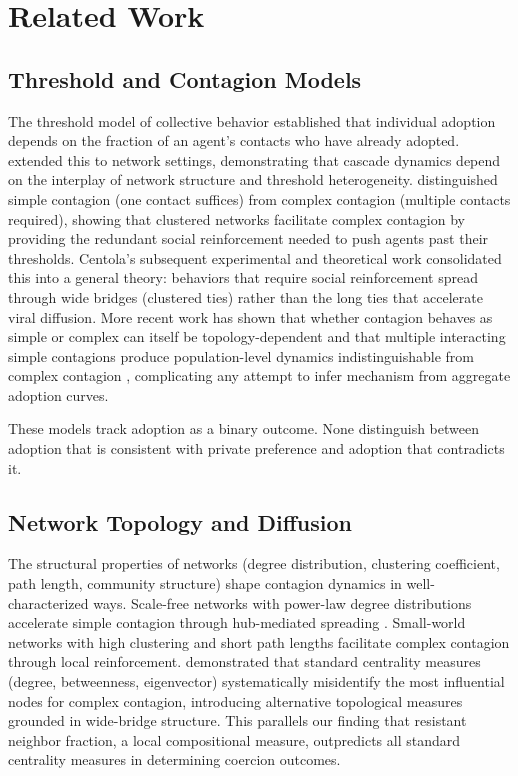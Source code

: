 \documentclass[11pt, a4paper]{article}
\begin{document}
\section{Related Work}
\label{sec:related}

\subsection{Threshold and Contagion Models}

The threshold model of collective behavior \citep{granovetter1978threshold} established that individual adoption depends on the fraction of an agent's contacts who have already adopted. \citet{watts2002simple} extended this to network settings, demonstrating that cascade dynamics depend on the interplay of network structure and threshold heterogeneity. \citet{centola2007complex} distinguished simple contagion (one contact suffices) from complex contagion (multiple contacts required), showing that clustered networks facilitate complex contagion by providing the redundant social reinforcement needed to push agents past their thresholds. Centola's subsequent experimental and theoretical work \citep{centola2018behavior} consolidated this into a general theory: behaviors that require social reinforcement spread through wide bridges (clustered ties) rather than the long ties that accelerate viral diffusion. More recent work has shown that whether contagion behaves as simple or complex can itself be topology-dependent \citep{horsevad2022transition} and that multiple interacting simple contagions produce population-level dynamics indistinguishable from complex contagion \citep{hebert2020macroscopic}, complicating any attempt to infer mechanism from aggregate adoption curves.

These models track adoption as a binary outcome. None distinguish between adoption that is consistent with private preference and adoption that contradicts it.

\subsection{Network Topology and Diffusion}

The structural properties of networks (degree distribution, clustering coefficient, path length, community structure) shape contagion dynamics in well-characterized ways. Scale-free networks with power-law degree distributions \citep{barabasi1999emergence} accelerate simple contagion through hub-mediated spreading \citep{pastor2001epidemic}. Small-world networks with high clustering and short path lengths \citep{watts1998collective} facilitate complex contagion through local reinforcement. \citet{guilbeault2021topological} demonstrated that standard centrality measures (degree, betweenness, eigenvector) systematically misidentify the most influential nodes for complex contagion, introducing alternative topological measures grounded in wide-bridge structure. This parallels our finding that resistant neighbor fraction, a local compositional measure, outpredicts all standard centrality measures in determining coercion outcomes.
\end{document}
